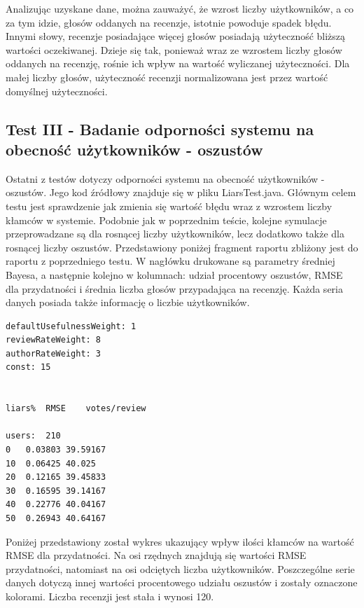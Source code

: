 Analizując uzyskane dane, można zauważyć, że wzrost liczby użytkowników, a co za tym idzie, głosów oddanych na recenzje, istotnie powoduje spadek błędu. Innymi słowy, recenzje posiadające więcej głosów posiadają użyteczność bliższą wartości oczekiwanej. Dzieje się tak, ponieważ wraz ze wzrostem liczby głosów oddanych na recenzję, rośnie ich wpływ na wartość wyliczanej użyteczności. Dla małej liczby głosów, użyteczność recenzji normalizowana jest przez wartość domyślnej użyteczności.

\subsection{Test III - Badanie odporności systemu na obecność użytkowników - oszustów}

Ostatni z testów dotyczy odporności systemu na obecność użytkowników - oszustów. Jego kod źródłowy znajduje się w pliku LiarsTest.java. Głównym celem testu jest sprawdzenie jak zmienia się wartość błędu wraz z wzrostem liczby kłamców w systemie. Podobnie jak w poprzednim teście, kolejne symulacje przeprowadzane są dla rosnącej liczby użytkowników, lecz dodatkowo także dla rosnącej liczby oszustów. Przedstawiony poniżej fragment raportu zbliżony jest do raportu z poprzedniego testu. W nagłówku drukowane są parametry średniej Bayesa, a następnie kolejno w kolumnach: udział procentowy oszustów, RMSE dla przydatności i średnia liczba głosów przypadająca na recenzję. Każda seria danych posiada także informację o liczbie użytkowników.

\begin{lstlisting}
defaultUsefulnessWeight: 1
reviewRateWeight: 8
authorRateWeight: 3
const: 15


liars%	RMSE	votes/review

users:	210
0	0.03803	39.59167
10	0.06425	40.025
20	0.12165	39.45833
30	0.16595	39.14167
40	0.22776	40.04167
50	0.26943	40.64167
\end{lstlisting}

Poniżej przedstawiony został wykres ukazujący wpływ ilości kłamców na wartość RMSE dla przydatności. Na osi rzędnych znajdują się wartości RMSE przydatności, natomiast na osi odciętych liczba użytkowników. Poszczególne serie danych dotyczą innej wartości procentowego udziału oszustów i zostały oznaczone kolorami. Liczba recenzji jest stała i wynosi 120.

